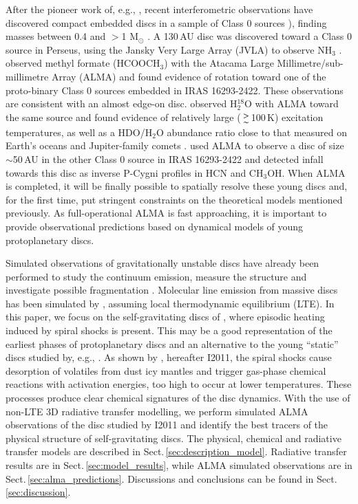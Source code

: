 \documentclass[useAMS,usenatbib]{mn2e}
\begin{document}
After the pioneer work of, e.g., \citet{Chandler1995,Brown2000,Looney2000}, recent interferometric observations have discovered compact embedded discs in a sample of Class 0 sources \citep{Andre1999}), finding masses between 0.4 and  $>$1 M$_{\odot}$ \citep{Jorgensen2007,Jorgensen2009,Enoch2011}. A 130\,AU disc was discovered toward a Class 0 source in Perseus, using the Jansky Very Large Array (JVLA) to observe NH$_3$ \citep{Choi2007}. \citet{Pineda2012} observed methyl formate (HCOOCH$_3$) with the Atacama Large Millimetre/sub-millimetre Array (ALMA) and found evidence of rotation toward one of the proto-binary Class 0 sources embedded in IRAS 16293-2422. These observations are consistent with an almost edge-on disc. \citet{Persson2012} observed H$_2^{18}$O with ALMA toward the same source and found evidence of relatively large ($\ga$100\,K) excitation temperatures, as well as a HDO/H$_2$O abundance ratio close to that measured on Earth's oceans and Jupiter-family comets \citep{Hartogh2012}. \citet{Zapata2013} used ALMA to observe a disc of size $\sim$50$\,$AU in the other Class 0 source in IRAS 16293-2422 and detected infall towards this disc as inverse P-Cygni profiles in HCN and CH$_3$OH. When ALMA is completed, it will be finally possible to spatially resolve these young discs and, for the first time, put stringent constraints on the theoretical models mentioned previously. As full-operational ALMA is fast approaching, it is important to provide observational predictions based on dynamical models of young protoplanetary discs. \newline 

Simulated observations of gravitationally unstable discs have already been performed to study the continuum emission, measure the structure and investigate possible fragmentation \citep{Cossins2010,Ruge2013}. Molecular line emission from massive discs has been simulated by \citet{Krumholz2007}, assuming local thermodynamic equilibrium (LTE). In this paper, we focus on the self-gravitating discs of \citet{Boley2008}, where episodic heating induced by spiral shocks is present. This may be a good representation of the earliest phases of protoplanetary discs and an alternative to the young ``static'' discs studied by, e.g., \citet{Visser2009,Visser2011}. As shown by \citet{Ilee2011}, hereafter I2011, the spiral shocks cause desorption of volatiles from dust icy mantles and trigger gas-phase chemical reactions with activation energies, too high to occur at lower temperatures. These processes produce clear chemical signatures of the disc dynamics. With the use of non-LTE 3D radiative transfer modelling, we perform simulated ALMA observations of the disc studied by I2011 and identify the best tracers of the physical structure of self-gravitating discs. The physical, chemical and radiative transfer models are described in Sect.\,\ref{sec:description_model}. Radiative transfer results are in Sect.\,\ref{sec:model_results}, while ALMA simulated observations are in Sect.\,\ref{sec:alma_predictions}. Discussions and conclusions can be found in Sect.\,\ref{sec:discussion}. 
\end{document}
